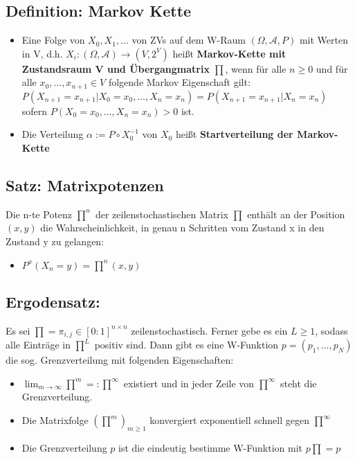 \documentclass[a4paper,11pt]{scrartcl}
\begin{document}
\subsection{Definition: Markov Kette}
\begin{itemize}
    \item Eine Folge von $X_0,X_1,\dots$ von ZVs auf dem W-Raum $(\Omega,\mathcal{A},P)$ mit Werten in V, d.h. $X_i :(\Omega,\mathcal{A}) \rightarrow (V,2^V)$ heißt \textbf{Markov-Kette mit Zustandsraum V und Übergangmatrix} $\prod$, wenn für alle $n \geq 0$ und für alle $x_0,\dots,x_{n+1} \in V$ folgende Markov Eigenschaft gilt:
        $P(X_{n+1} = x_{n+1}| X_0 = x_0, \dots, X_n = x_n) = P(X_{n+1} = x_{n+1}| X_n =x_n)$ sofern $P(X_0 = x_0, \dots, X_n = x_n) >0$ ist.
    \item Die Verteilung $\alpha := P \circ X^{-1}_0$ von $X_0$ heißt \textbf{Startverteilung der Markov-Kette}
\end{itemize}

\subsection{Satz: Matrixpotenzen}
Die n-te Potenz $\prod^n$ der zeilenstochastischen Matrix $\prod$ enthält an der Position $(x,y)$ die Wahrscheinlichkeit, in genau n Schritten vom Zustand x in den Zustand y zu gelangen:
\begin{itemize}
    \item $P^x(X_n=y)= \prod^n (x,y)$
\end{itemize}

\subsection{Ergodensatz:}
Es sei $\prod = \pi_{i,j} \in [0:1]^{n \times n}$ zeilenstochastisch. Ferner gebe es ein $L \geq 1 $, sodass alle Einträge in $\prod^L$ positiv sind. Dann gibt es eine W-Funktion $p = (p_1,\dots,p_N)$ die sog. Grenzverteilung mit folgenden Eigenschaften:
\begin{itemize}
    \item $\lim_{m \rightarrow \infty} \prod^m =: \prod^\infty$ existiert und in jeder Zeile von $\prod^\infty$ steht die Grenzverteilung.
    \item Die Matrixfolge $(\prod^m)_{m\geq 1}$ konvergiert exponentiell schnell gegen $\prod^\infty$
    \item Die Grenzverteilung $p$ ist die eindeutig bestimme W-Funktion mit $p \prod = p$
\end{itemize}
\end{document}
